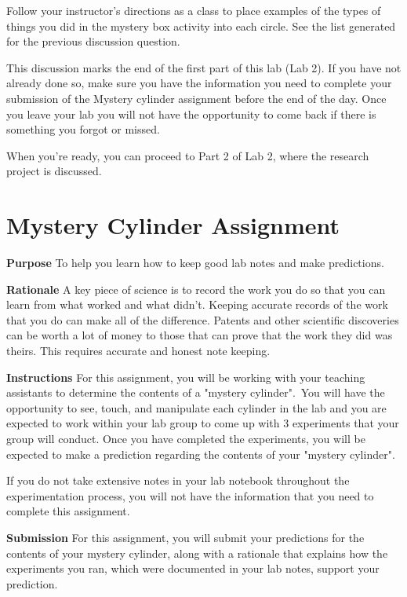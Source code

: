 \documentclass[
]{book}
\begin{document}
Follow your instructor's directions as a class to place examples of the types of things you did in the mystery box activity into each circle. See the list generated for the previous discussion question.

This discussion marks the end of the first part of this lab (Lab 2). If you have not already done so, make sure you have the information you need to complete your submission of the Mystery cylinder assignment before the end of the day. Once you leave your lab you will not have the opportunity to come back if there is something you forgot or missed.

When you're ready, you can proceed to Part 2 of Lab 2, where the research project is discussed.

\hypertarget{mystery-cylinder-assignment}{%
\section*{Mystery Cylinder Assignment}\label{mystery-cylinder-assignment}}

\textbf{Purpose} To help you learn how to keep good lab notes and make predictions.

\textbf{Rationale} A key piece of science is to record the work you do so that you can learn from what worked and what didn't. Keeping accurate records of the work that you do can make all of the difference. Patents and other scientific discoveries can be worth a lot of money to those that can prove that the work they did was theirs. This requires accurate and honest note keeping.

\textbf{Instructions} For this assignment, you will be working with your teaching assistants to determine the contents of a "mystery cylinder".\, You will have the opportunity to see, touch, and manipulate each cylinder in the lab and you are expected to work within your lab group to come up with 3 experiments that your group will conduct. Once you have completed the experiments, you will be expected to make a prediction regarding the contents of your "mystery cylinder".

If you do not take extensive notes in your lab notebook throughout the experimentation process, you will not have the information that you need to complete this assignment. \,

\textbf{Submission} For this assignment, you will submit your predictions for the contents of your mystery cylinder, along with a rationale that explains how the experiments you ran, which were documented in your lab notes, support your prediction.
\end{document}
